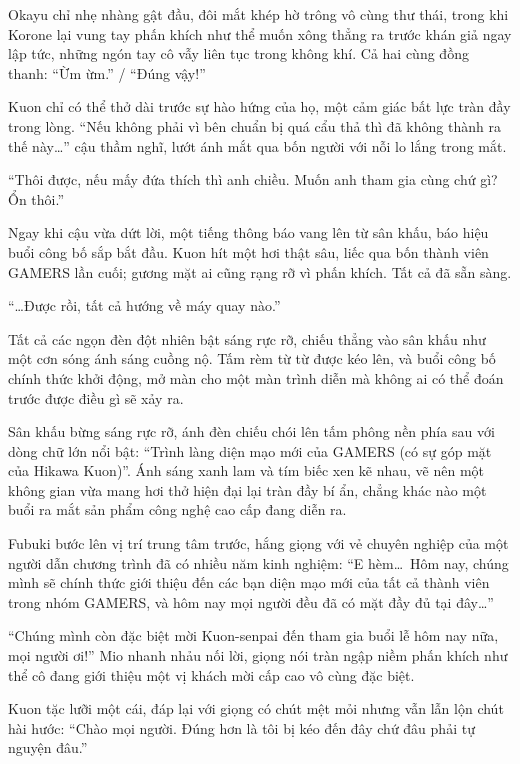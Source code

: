 \documentclass[../main.tex]{subfiles}
\begin{document}
Okayu chỉ nhẹ nhàng gật đầu, đôi mắt khép hờ trông vô cùng thư thái, trong khi Korone lại vung tay phấn khích như thể muốn xông thẳng ra trước khán giả ngay lập tức, những ngón tay cô vẫy liên tục trong không khí. Cả hai cùng đồng thanh: ``Ừm ừm.'' / ``Đúng vậy!''

Kuon chỉ có thể thở dài trước sự hào hứng của họ, một cảm giác bất lực tràn đầy trong lòng. ``Nếu không phải vì bên chuẩn bị quá cẩu thả thì đã không thành ra thế này\dots'' cậu thầm nghĩ, lướt ánh mắt qua bốn người với nỗi lo lắng trong mắt.

``Thôi được, nếu mấy đứa thích thì anh chiều. Muốn anh tham gia cùng chứ gì? Ổn thôi.''

Ngay khi cậu vừa dứt lời, một tiếng thông báo vang lên từ sân khấu, báo hiệu buổi công bố sắp bắt đầu. Kuon hít một hơi thật sâu, liếc qua bốn thành viên GAMERS lần cuối; gương mặt ai cũng rạng rỡ vì phấn khích. Tất cả đã sẵn sàng.

``\dots Được rồi, tất cả hướng về máy quay nào.''

Tất cả các ngọn đèn đột nhiên bật sáng rực rỡ, chiếu thẳng vào sân khấu như một cơn sóng ánh sáng cuồng nộ. Tấm rèm từ từ được kéo lên, và buổi công bố chính thức khởi động, mở màn cho một màn trình diễn mà không ai có thể đoán trước được điều gì sẽ xảy ra.

\il

Sân khấu bừng sáng rực rỡ, ánh đèn chiếu chói lên tấm phông nền phía sau với dòng chữ lớn nổi bật: ``Trình làng diện mạo mới của GAMERS (có sự góp mặt của Hikawa Kuon)''. Ánh sáng xanh lam và tím biếc xen kẽ nhau, vẽ nên một không gian vừa mang hơi thở hiện đại lại tràn đầy bí ẩn, chẳng khác nào một buổi ra mắt sản phẩm công nghệ cao cấp đang diễn ra.

Fubuki bước lên vị trí trung tâm trước, hắng giọng với vẻ chuyên nghiệp của một người dẫn chương trình đã có nhiều năm kinh nghiệm: ``E hèm\dots\ Hôm nay, chúng mình sẽ chính thức giới thiệu đến các bạn diện mạo mới của tất cả thành viên trong nhóm GAMERS, và hôm nay mọi người đều đã có mặt đầy đủ tại đây\dots''

``Chúng mình còn đặc biệt mời Kuon-senpai đến tham gia buổi lễ hôm nay nữa, mọi người ơi!'' Mio nhanh nhảu nối lời, giọng nói tràn ngập niềm phấn khích như thể cô đang giới thiệu một vị khách mời cấp cao vô cùng đặc biệt.

Kuon tặc lưỡi một cái, đáp lại với giọng có chút mệt mỏi nhưng vẫn lẫn lộn chút hài hước: ``Chào mọi người. Đúng hơn là tôi bị kéo đến đây chứ đâu phải tự nguyện đâu.''
\end{document}

